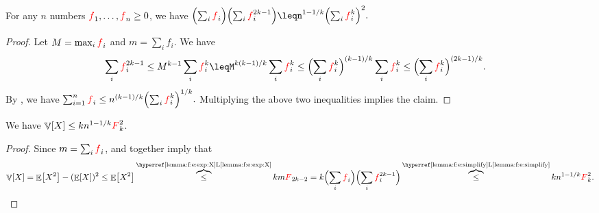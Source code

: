\begin{lemma}
    For any $n$ numbers ${\textcolor{red}{f}}_1, \ldots,{\textcolor{red}{f}}_n \geq 0$, we have
    \begin{math}
        \Bigl({\sum_i \frq_i} \Bigr) \Bigl( \sum_i \frq_i^{2k-1}
        \Bigr) %
        \leq%
        n^{1-1/k} \Bigl(\sum_i \frq_i^{k}\Bigr)^2.
    \end{math}
\end{lemma}
\begin{proof}
    Let $M =\max_i {\textcolor{red}{f}}_i$ and $m = \sum_i f_i$. We have
    \begin{align*}
      \sum_i \frq_i^{2k-1}
      &\leq
        M^{k-1}
        \sum_i \frq_i^{k}
        \leq%
        M^{k(k-1)/k}
        \sum_i \frq_i^{k}
        \leq%
        \Bigl(\sum_i \frq_i^k\Bigr)^{(k-1)/{k}}
        \sum_i \frq_i^{k}
        \leq%
        \Bigl(\sum_i \frq_i^k\Bigr)^{(2k-1)/{k}}.
    \end{align*}
    By , we have
    \begin{math}
        \sum_{i=1}^{n} \frq_i %
        \leq
        n^{(k-1)/k} \Bigl( \sum_i \frq_i^k\Bigr)^{1/k}.%
    \end{math}
    Multiplying the above two inequalities implies the claim.
\end{proof}


\begin{lemma}
    We have $\mathop{\mathbb{V}}\!\left[ {X} \right] \leq k n^{1-1/k} {\textcolor{red}{F}}_k^2$.
\end{lemma}
\begin{proof}
    Since $m = \sum_i {\textcolor{red}{f}}_i$,  and
     together imply that
    \begin{equation*}
        \Var{X}%
        =%
        \Ex{X^2} - (\Ex{X})^2 \leq \Ex{X^2}%
        \overbrace{\leq}^{\text{\lemrefshort{f:e:exp:X}}}
        k m \Frq_{2k-2}%
        =%
        k \Bigl({\sum_i \frq_i} \Bigr) \Bigl( \sum_i \frq_i^{2k-1}
        \Bigr) %
        \overbrace{\leq}^{\text{\lemrefshort{f:e:simplify}}}
        k n^{1-1/k} \Frq_k^2.
    \end{equation*}
\end{proof}



